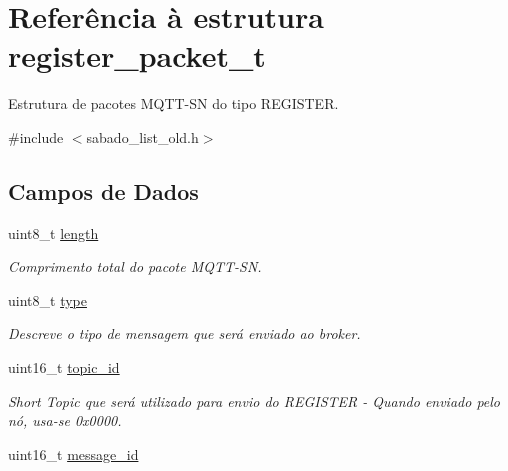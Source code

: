 \hypertarget{structregister__packet__t}{\section{Referência à estrutura register\+\_\+packet\+\_\+t}
\label{structregister__packet__t}
}


Estrutura de pacotes M\+Q\+T\+T-\/\+S\+N do tipo R\+E\+G\+I\+S\+T\+E\+R.  




{\ttfamily \#include $<$sabado\+\_\+list\+\_\+old.\+h$>$}

\subsection*{Campos de Dados}
\begin{DoxyCompactItemize}
\item 
\hypertarget{group__Pacotes_gaf9d495c1655d813d553030485d00fea7}{uint8\+\_\+t \hyperlink{group__Pacotes_gaf9d495c1655d813d553030485d00fea7}{length}}\label{group__Pacotes_gaf9d495c1655d813d553030485d00fea7}

\begin{DoxyCompactList}\small\item\em Comprimento total do pacote M\+Q\+T\+T-\/\+S\+N. \end{DoxyCompactList}\item 
\hypertarget{group__Pacotes_ga7aead736a07eaf25623ad7bfa1f0ee2d}{uint8\+\_\+t \hyperlink{group__Pacotes_ga7aead736a07eaf25623ad7bfa1f0ee2d}{type}}\label{group__Pacotes_ga7aead736a07eaf25623ad7bfa1f0ee2d}

\begin{DoxyCompactList}\small\item\em Descreve o tipo de mensagem que será enviado ao broker. \end{DoxyCompactList}\item 
\hypertarget{group__Pacotes_gab0380a82be366f48263095460986c3c7}{uint16\+\_\+t \hyperlink{group__Pacotes_gab0380a82be366f48263095460986c3c7}{topic\+\_\+id}}\label{group__Pacotes_gab0380a82be366f48263095460986c3c7}

\begin{DoxyCompactList}\small\item\em Short Topic que será utilizado para envio do R\+E\+G\+I\+S\+T\+E\+R -\/ Quando enviado pelo nó, usa-\/se 0x0000. \end{DoxyCompactList}\item 
\hypertarget{group__Pacotes_ga5f2be45182f0cc39afb7cc3a8d55a1f1}{uint16\+\_\+t \hyperlink{group__Pacotes_ga5f2be45182f0cc39afb7cc3a8d55a1f1}{message\+\_\+id}}\label{group__Pacotes_ga5f2be45182f0cc39afb7cc3a8d55a1f1}


\end{DoxyCompactItemize}
